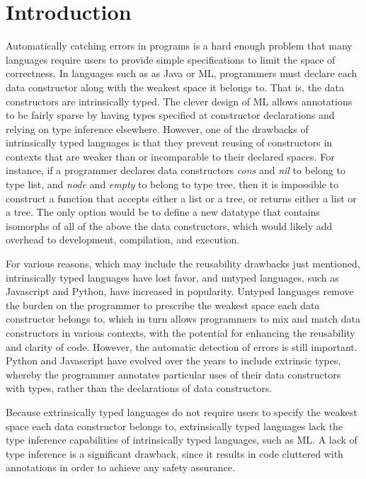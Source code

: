 \documentclass[acmsmall]{acmart}
\theoremstyle{definition}
\begin{document}
\section{Introduction}
\label{sec:introduction}

Automatically catching errors in programs is a hard enough problem
that many languages require users to provide simple specifications to limit the space of correctness.
In languages such as as Java or ML, programmers must declare each data constructor along with the weakest space it belongs to. 
That is, the data constructors are intrinsically typed.
The clever design of ML allows annotations to be fairly sparse by 
having types specified at constructor declarations and relying on type inference elsewhere.
However, one of the drawbacks of intrinsically typed languages is that they prevent reusing of
constructors in contexts that are weaker than or incomparable to their declared spaces. 
For instance, if a programmer declares data constructors \emph{cons} and \emph{nil} to belong to type list,
and \emph{node} and \emph{empty} to belong to type tree, then it is impossible to construct a function
that accepts either a list or a tree, or returns either a list or a tree. The only option would be to define
a new datatype that contains isomorphs of all of the above the data constructors, which would 
likely add overhead to development, compilation, and execution.


For various reasons, which may include the reusability drawbacks just mentioned, 
intrinsically typed languages have lost favor,
and untyped languages, 
such as Javascript and Python, have increased in popularity. 
Untyped languages remove the burden on the programmer to prescribe the weakest space each data constructor belongs to, 
which in turn allows programmers to mix and match data constructors in
various contexts, with the potential for enhancing the reusability and clarity of code.
However, the automatic detection of errors is still important. Python and Javascript have 
evolved over the years to include extrinsic types, whereby the programmer annotates particular uses of
their data constructors with types, rather than the declarations of data constructors.
 
Because extrinsically typed languages do not require users to specify the weakest space each data constructor belongs to,
extrinsically typed languages lack the type inference capabilities of intrinsically typed languages, such as ML. 
A lack of type inference is a significant drawback, since it results in code cluttered with annotations in order
to achieve any safety assurance.
\end{document}

